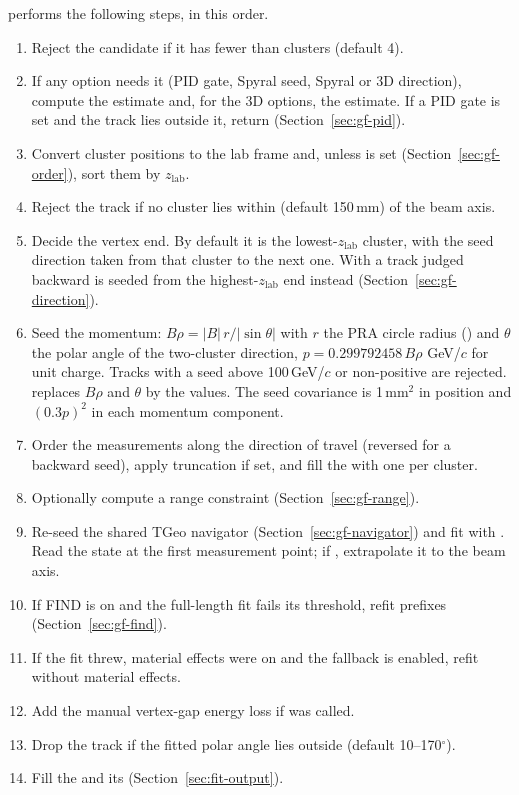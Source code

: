  performs the following steps, in this order.
\begin{enumerate}
\item Reject the candidate if it has fewer than  clusters (default 4).
\item If any option needs it (PID gate, Spyral seed, Spyral or 3D direction), compute the  estimate
  and, for the 3D options, the  estimate. If a PID gate is set and the track lies outside it, return
   (Section~\ref{sec:gf-pid}).
\item Convert cluster positions to the lab frame and, unless  is set
  (Section~\ref{sec:gf-order}), sort them by $z_\mathrm{lab}$.
\item Reject the track if no cluster lies within  (default 150\,mm) of the beam axis.
\item Decide the vertex end. By default it is the lowest-$z_\mathrm{lab}$ cluster, with the seed direction taken from
  that cluster to the next one. With  a track judged backward is seeded from the
  highest-$z_\mathrm{lab}$ end instead (Section~\ref{sec:gf-direction}).
\item Seed the momentum: $B\rho = |B|\,r/|\sin\theta|$ with $r$ the PRA circle radius () and
  $\theta$ the polar angle of the two-cluster direction, $p = 0.299792458\,B\rho$ GeV/$c$ for unit charge. Tracks
  with a seed above 100\,GeV/$c$ or non-positive are rejected.  replaces $B\rho$ and
  $\theta$ by the  values. The seed covariance is 1\,mm$^2$ in position and $(0.3p)^2$ in each
  momentum component.
\item Order the measurements along the direction of travel (reversed for a backward seed), apply truncation if set,
  and fill the  with one  per cluster.
\item Optionally compute a range constraint (Section~\ref{sec:gf-range}).
\item Re-seed the shared TGeo navigator (Section~\ref{sec:gf-navigator}) and fit with
  . Read the state at the first measurement point; if
  , extrapolate it to the beam axis.
\item If FIND is on and the full-length fit fails its threshold, refit prefixes (Section~\ref{sec:gf-find}).
\item If the fit threw, material effects were on and the fallback is enabled, refit without material effects.
\item Add the manual vertex-gap energy loss if  was called.
\item Drop the track if the fitted polar angle lies outside  (default 10--170$^\circ$).
\item Fill the  and its  (Section~\ref{sec:fit-output}).
\end{enumerate}

